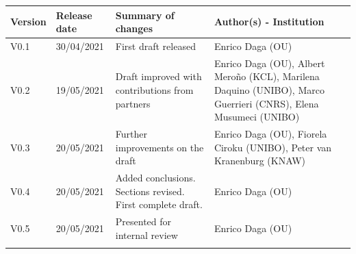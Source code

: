 \begin{tabular}{|l|l|p{5.5cm}|p{5.5cm}|}\hline
  \textbf{Version} & \textbf{Release date} & \textbf{Summary of changes} & \textbf{Author(s) - Institution}\\\hline  
  V0.1 & 30/04/2021 & First draft released & Enrico Daga (OU)\\\hline  
  V0.2 & 19/05/2021 & Draft improved with contributions from partners & Enrico Daga (OU), Albert Mero\~no (KCL), Marilena Daquino (UNIBO), Marco Guerrieri (CNRS), Elena Musumeci (UNIBO) \\\hline  
  V0.3 & 20/05/2021 & Further improvements on the draft & Enrico Daga (OU), Fiorela Ciroku (UNIBO), Peter van Kranenburg (KNAW) \\\hline  
  V0.4 & 20/05/2021 & Added conclusions. Sections revised. First complete draft. & Enrico Daga (OU) \\\hline  
  V0.5 & 20/05/2021 & Presented for internal review & Enrico Daga (OU) \\\hline  
  & & & \\\hline  
  \end{tabular}

  \clearpage




